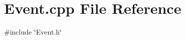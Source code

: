\section{Event.\+cpp File Reference}
\label{Event_8cpp}
{\ttfamily \#include \char`\"{}Event.\+h\char`\"{}}\newline
